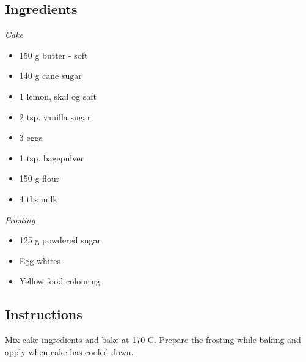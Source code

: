 \documentclass[11pt]{article}
\begin{document}
\subsection*{Ingredients}

\textit{Cake}
\begin{itemize}
    \item 150 g butter - soft
    \item 140 g cane sugar
    \item 1 lemon, skal og saft
    \item 2 tsp. vanilla sugar
    \item 3 eggs
    \item 1 tsp. bagepulver
    \item 150 g flour
    \item 4 tbs milk
\end{itemize}

\textit{Frosting}
\begin{itemize}
    \item 125 g powdered sugar
    \item Egg whites
    \item Yellow food colouring
\end{itemize}

\subsection*{Instructions}

Mix cake ingredients and bake at 170 C\textdegree. Prepare the frosting while baking
and apply when cake has cooled down.
\end{document}
